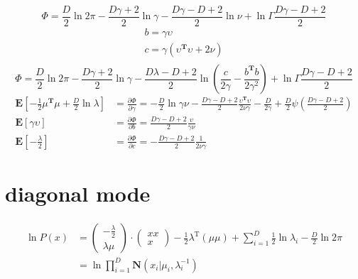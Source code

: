 \documentclass{article}
\begin{document}
$$
\Phi = \frac{D}{2}\ln2\pi
    - \frac{D\gamma + 2}{2}\ln\gamma
    - \frac{D\gamma-D+2}{2}\ln \nu
    + \ln\Gamma\frac{D\gamma -D + 2}{2}
$$
$$
\begin{aligned}
b = \gamma \upsilon\\
c = \gamma(\upsilon^\textbf{T}\upsilon + 2\nu)\\
\end{aligned}
$$
$$
\Phi = \frac{D}{2}\ln2\pi - \frac{D\gamma + 2}{2}\ln\gamma - \frac{D\lambda-D+2}{2}\ln(\frac{c}{2\gamma} - \frac{b^\textbf{T}b}{2\gamma^2}) + \ln\Gamma\frac{D\gamma-D+2}{2}
$$
$$
\begin{aligned}
\textbf{E}[-\frac{1}{2}\mu^\textbf{T}\mu + \frac{D}{2}\ln \lambda]
    &= \frac{\partial\Phi}{\partial\gamma} = -\frac{D}{2}\ln\gamma\nu
    - \frac{D\gamma-D+2}{2}\frac{\upsilon^\textbf{T}\upsilon}{2\nu\gamma} -\frac{D}{2\gamma}+\frac{D}{2}\psi(\frac{D\gamma-D+2}{2})\\
\textbf{E}[\gamma\upsilon]
    &= \frac{\partial\Phi}{\partial b}
    = \frac{D\gamma-D+2}{2}\frac{\upsilon}{\gamma\nu}\\
\textbf{E}[-\frac{\lambda}{2}]
    &= \frac{\partial\Phi}{\partial c} = -\frac{D\gamma-D+2}{2}\frac{1}{2\nu\gamma}
\end{aligned}
$$



\section{diagonal mode}
$$
\begin{aligned}
\ln P(x)& =
\left(
    \begin{aligned}
        - \frac{\lambda}{2}\\
        \lambda \mu
    \end{aligned}
\right)
\cdot
\left(
    \begin{aligned}
        xx\\
        x
    \end{aligned}
\right) -\frac{1}{2}\lambda ^ \mathrm{T} (\mu \mu) + \sum_{i=1}^{D}\frac{1}{2} \ln \lambda_i - \frac{D}{2} \ln2\pi \\
& = \ln\prod_{i=1}^{D}\textbf{N}(x_i|\mu_i,\lambda_i^{-1})
\end{aligned}
$$
\end{document}
